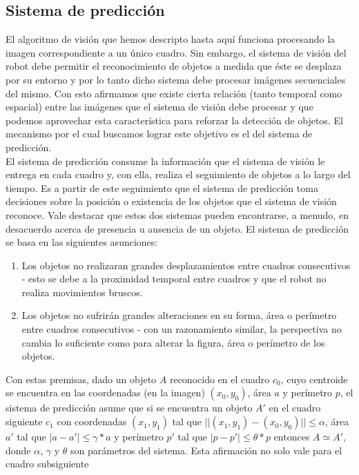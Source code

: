 	\subsection{Sistema de predicción}
	El algoritmo de visión que hemos descripto hasta aquí funciona 
	procesando la imagen correspondiente a un único cuadro. Sin embargo, 
	el sistema de visión del robot debe permitir el reconocimiento de 
	objetos a medida que éste se desplaza por su entorno y por lo tanto 
	dicho sistema debe procesar imágenes secuenciales del mismo. Con 
	esto afirmamos que existe cierta relación (tanto temporal como 
	espacial) entre las imágenes 
	que el sistema de visión debe procesar y que podemos aprovechar esta 
	característica para reforzar la detección de objetos. El mecanismo por el cual buscamos lograr este objetivo es el del sistema de predicción.\\
\indent 	El sistema de predicción consume la información que el 
sistema de visión le entrega en cada cuadro y, con ella, realiza el 
seguimiento de objetos a lo largo del tiempo. Es a partir de este 
seguimiento que el sistema de predicción toma decisiones sobre la 
posición o existencia de los objetos que el sistema de visión 
reconoce. Vale destacar que estos dos sistemas pueden encontrarse, a 
menudo, en desacuerdo acerca de presencia u ausencia 
de un objeto.  El sistema de predicción se basa en las siguientes asunciones:
\begin{enumerate}
\item{ Los objetos no realizaran grandes desplazamientos entre cuadros 
consecutivos - esto se debe a la proximidad temporal entre cuadros y que el robot no realiza movimientos bruscos.}
\item{ Los objetos no sufrirán grandes alteraciones en su forma, área 
o perímetro entre cuadros consecutivos - con un razonamiento similar, la perspectiva no cambia lo suficiente como para alterar la figura, área o perímetro de los objetos.}
\end{enumerate} 
Con estas premisas, dado un objeto $A$ reconocido en el cuadro $c_0$, 
cuyo centroide se encuentra en las coordenadas (en la imagen) $(x_0,y_0)$, área $a$ y perímetro $p$, 
el sistema de predicción asume que si se encuentra un objeto $A'$ en 
el cuadro siguiente $c_1$ con coordenadas $(x_1, y_1)$ tal que 
$||(x_1,y_1) - (x_0,y_0)||\leq \alpha$, área $a'$ tal que $|a-a'| \leq 
\gamma *a$ y perímetro $p'$ tal que $|p-p'|\leq \theta*p$ entonces $A 
\simeq A'$, donde $\alpha$, $\gamma$ y $\theta$ son parámetros del 
sistema. Esta afirmación no solo vale para el cuadro subsiguiente 
